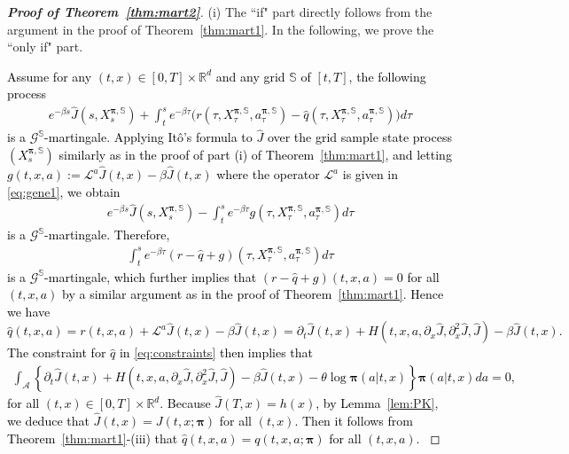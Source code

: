 \documentclass[11pt]{article}
\newcommand{\1}{\mathbbm{1}}
\newcommand{\rev}[1]{\textcolor{black}{{#1}}} %
\begin{document}
\begin{proof}[\bf Proof of Theorem~\ref{thm:mart2}]

(i) The ``if" part directly follows from the argument in the proof of Theorem~\ref{thm:mart1}. In the following, we prove the ``only if" part.

\rev{Assume for any
	$(t,x) \in [0, T] \times \mathbb{R}^d $ and any grid $\mathbb{S}$ of $[t,T]$, the following process
	\begin{align}
		e^{-\beta s} \hat J(s, X_s^{ \boldsymbol{\pi} , \mathbb{S}}) +      \int_t^s e^{-\beta \tau } \big( r( \tau, X_{\tau}^{\boldsymbol{\pi} , \mathbb{S}}, a_{\tau}^{\boldsymbol{\pi},  \mathbb{S}}) - \hat q ( \tau, X_{\tau}^{\boldsymbol{\pi}, \mathbb{S}}, a_{\tau}^{\boldsymbol{\pi, \mathbb{S}}}) \big) d\tau
	\end{align}
	is a $\mathcal{G}^{\mathbb{S}}$-martingale. Applying It\^{o}'s formula to $\hat J$ over the grid sample state process $(X_s^{ \boldsymbol{\pi}, \mathbb{S}})$  similarly as in the proof of part (i) of Theorem~\ref{thm:mart1}, and letting $g(t,x, a):= \mathcal{L}^a \hat J(t,x) - \beta \hat J(t,x)$ where the operator $\mathcal{L}^a$ is given in \eqref{eq:gene1}, we obtain
\begin{align}
e^{-\beta s} \hat J(s, X_s^{ \boldsymbol{\pi}, \mathbb{S}}) -    \int_t^s e^{-\beta \tau}   g(\tau, X_{\tau}^{\boldsymbol{\pi}, \mathbb{S}}, a_{\tau}^{\boldsymbol{\pi}, \mathbb{S}}) d\tau
\end{align}
is a $\mathcal{G}^{\mathbb{S}}$-martingale. Therefore,
\begin{align}
 \int_t^s e^{-\beta \tau}  (r- \hat q + g)(\tau, X_{\tau}^{\boldsymbol{\pi}, \mathbb{S}}, a_{\tau}^{\boldsymbol{\pi}, \mathbb{S}}) d\tau
\end{align}
is a $\mathcal{G}^{\mathbb{S}}$-martingale, which further implies that $(r- \hat q + g)(t,x,a)=0$ for all $(t,x,a)$ by a similar argument as in the proof of Theorem~\ref{thm:mart1}. Hence we have $$\hat q(t,x,a) = r(t,x,a) + \mathcal{L}^a \hat J(t,x) - \beta \hat J(t,x) = \partial_t\hat J(t,x) + H(t,x, a, \partial_x{\hat J},  \partial_x^2{\hat J}, {\hat J}) - \beta \hat J(t,x).$$ The constraint for $\hat q$ in \eqref{eq:constraints} then implies that
\begin{align}
	\int_{\mathcal{A}} \left\{ \partial_t\hat J(t,x) + H(t,x, a, \partial_x{\hat J},  \partial_x^2{\hat J}, {\hat J}) - \beta \hat J(t,x) - \theta \log \boldsymbol{\pi}(a| t,x)\right\} \boldsymbol{\pi}(a|t,x) da =0,
\end{align}
for all $(t,x) \in [0, T] \times \mathbb{R}^d.$ Because $\hat J(T,x) =h(x)$, by Lemma~\ref{lem:PK}, we deduce that $\hat J(t,x) = J(t,x; \boldsymbol{\pi}) $ for all $(t,x)$. Then it follows from Theorem~\ref{thm:mart1}-(iii) that
$\hat q(t,x, a) = q(t,x, a; \boldsymbol{\pi}) $ for all $(t,x,a)$.
}


\end{proof}
\end{document}
